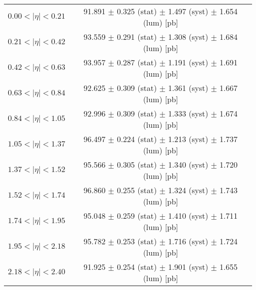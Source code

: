 \begin{tabular}{lc}
\hline
$0.00 < |\eta| <0.21$          & 91.891 $\pm$ 0.325 (stat) $\pm$ 1.497 (syst) $\pm$ 1.654 (lum) [pb]  \\
$0.21 < |\eta| <0.42$          & 93.559 $\pm$ 0.291 (stat) $\pm$ 1.308 (syst) $\pm$ 1.684 (lum) [pb]  \\
$0.42 < |\eta| <0.63$          & 93.957 $\pm$ 0.287 (stat) $\pm$ 1.191 (syst) $\pm$ 1.691 (lum) [pb]  \\
$0.63 < |\eta| <0.84$          & 92.625 $\pm$ 0.309 (stat) $\pm$ 1.361 (syst) $\pm$ 1.667 (lum) [pb]  \\
$0.84 < |\eta| <1.05$          & 92.996 $\pm$ 0.309 (stat) $\pm$ 1.333 (syst) $\pm$ 1.674 (lum) [pb]  \\
$1.05 < |\eta| <1.37$          & 96.497 $\pm$ 0.224 (stat) $\pm$ 1.213 (syst) $\pm$ 1.737 (lum) [pb]  \\
$1.37 < |\eta| <1.52$          & 95.566 $\pm$ 0.305 (stat) $\pm$ 1.340 (syst) $\pm$ 1.720 (lum) [pb]  \\
$1.52 < |\eta| <1.74$          & 96.860 $\pm$ 0.255 (stat) $\pm$ 1.324 (syst) $\pm$ 1.743 (lum) [pb]  \\
$1.74 < |\eta| <1.95$          & 95.048 $\pm$ 0.259 (stat) $\pm$ 1.410 (syst) $\pm$ 1.711 (lum) [pb]  \\
$1.95 < |\eta| <2.18$          & 95.782 $\pm$ 0.253 (stat) $\pm$ 1.716 (syst) $\pm$ 1.724 (lum) [pb]  \\
$2.18 < |\eta| <2.40$          & 91.925 $\pm$ 0.254 (stat) $\pm$ 1.901 (syst) $\pm$ 1.655 (lum) [pb]  \\
\hline
\end{tabular}
